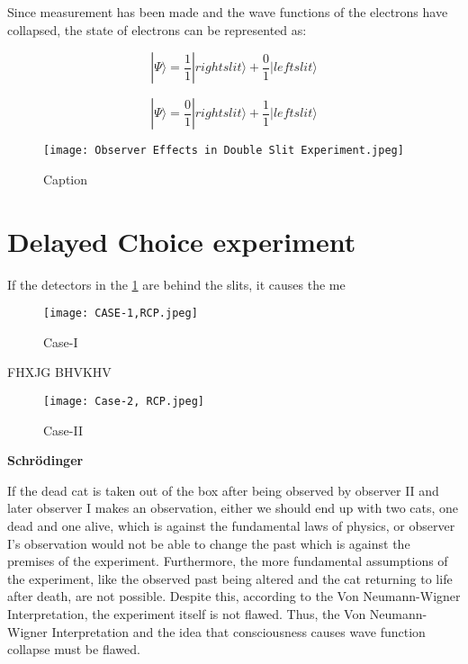 \documentclass{article}
\begin{document}
Since measurement has been made and the wave functions
of the electrons have collapsed, the state of electrons can be
represented as:

\begin{equation}
    |\Psi\rangle=\frac{1}{1}|right slit\rangle+ \frac{0}{1}|left slit\rangle
\end{equation}

\begin{equation}
    |\Psi\rangle=\frac{0}{1}|right slit\rangle+ \frac{1}{1}|left slit\rangle
\end{equation}


\begin{figure}[h]
    \centering
    \texttt{[image: Observer Effects in Double Slit Experiment.jpeg]}
    \caption{Caption}
    \label{Setup for Observer Effects }
\end{figure}





\section{Delayed Choice experiment}

If the detectors in the \ref{Setup for Observer Effects } are behind the slits, it causes the me

\begin{figure}
\centering[h]
     \texttt{[image: CASE-1,RCP.jpeg]}
      \caption{Case-I}
       \label{fig:Wavefn}
\end{figure}

\Large 
FHXJG
BHVKHV



\begin{figure}
\centering[h]
     \texttt{[image: Case-2, RCP.jpeg]}
      \caption{Case-II}
       \label{fig:Wavefn}
\end{figure}


\textbf{Schrödinger}



















If the dead cat is taken out of the box after being observed
by observer II and later observer I makes an observation, either we should end up with two cats, one dead and one alive,
which is against the fundamental laws of physics, or observer
I's observation would not be able to change the past which
is against the premises of the experiment. Furthermore, the
more fundamental assumptions of the experiment, like the
observed past being altered and the cat returning to life after death, are not possible. Despite this, according to the Von
Neumann-Wigner Interpretation, the experiment itself is
not flawed. Thus, the Von Neumann-Wigner Interpretation
and the idea that consciousness causes wave function collapse
must be flawed.
\end{document}
